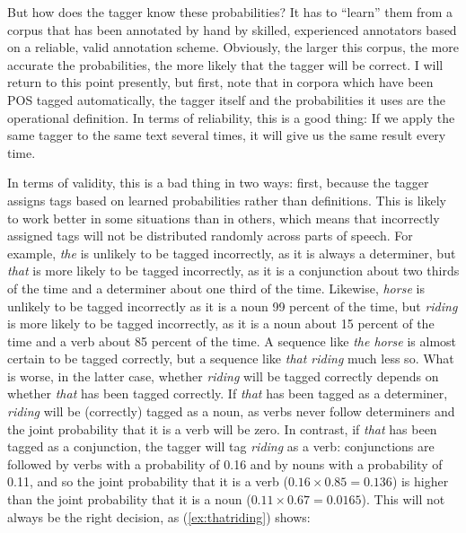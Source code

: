 But how does the tagger know these probabilities?  It has to ``learn'' them from a corpus that has been annotated  by hand by skilled, experienced annotators based on a reliable,  valid  annotation scheme. Obviously, the larger  this corpus, the more accurate the probabilities, the more likely that the tagger  will be correct. I will return to this point presently, but first, note that in corpora which have been POS tagged automatically, the tagger itself and the probabilities  it uses are the operational  definition. In terms of reliability,  this is a good thing: If we apply the same tagger to the same text several times, it will give us the same result every time.

In terms of validity,  this is a bad thing in two ways: first, because the tagger  assigns tags based on learned probabilities  rather than definitions. This is likely to work better in some situations than in others, which means that incorrectly assigned tags will not be distributed  randomly  across parts of speech. For example, \textit{the} is unlikely to be tagged incorrectly, as it is always a determiner,  but \textit{that} is more likely to be tagged incorrectly, as it is a conjunction  about two thirds of the time and a determiner about one third of the time. Likewise, \textit{horse} is unlikely to be tagged  incorrectly as it is a noun  99 percent of the time, but \textit{riding} is more likely to be tagged incorrectly, as it is a noun about 15 percent of the time and a verb  about 85 percent of the time. A sequence like \textit{the horse} is almost certain to be tagged correctly, but a sequence like \textit{that riding} much less so. What is worse, in the latter case, whether \textit{riding} will be tagged correctly depends on whether \textit{that} has been tagged correctly. If \textit{that} has been tagged  as a determiner,  \textit{riding} will be (correctly) tagged as a noun,  as verbs never follow determiners and the joint probability  that it is a verb  will be zero. In contrast, if \textit{that} has been tagged as a conjunction,  the tagger will tag \textit{riding} as a verb: conjunctions are followed by verbs with a probability of 0.16 and by nouns with a probability of 0.11, and so the joint probability that it is a verb ($0.16 \times 0.85 = 0.136$) is higher than the joint probability that it is a noun ($0.11 \times 0.67 = 0.0165$). This will not always be the right decision, as (\ref{ex:thatriding}) shows:

